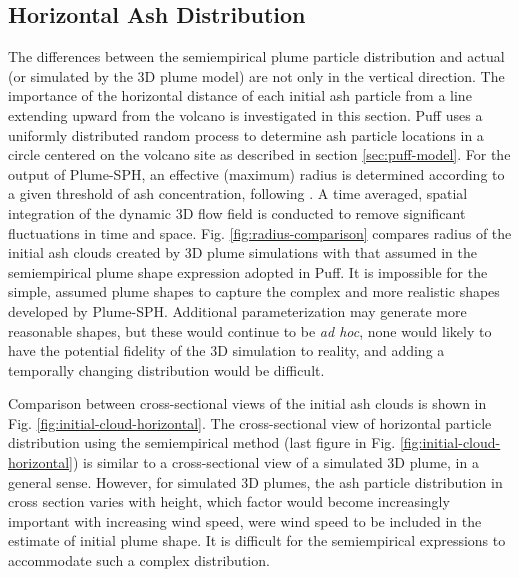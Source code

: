 \documentclass[utf8]{frontiersSCNS} %
\begin{document}
\subsection{Horizontal Ash Distribution}

The differences between the semiempirical plume particle distribution and actual (or simulated by the 3D plume model) are not only in the vertical direction. The importance of the horizontal distance of each initial ash particle from a line extending upward from the volcano is investigated in this section.  Puff uses a uniformly distributed random process to determine ash particle locations in a circle centered on the volcano site as described in section \ref{sec:puff-model}. For the output of Plume-SPH, an effective (maximum) radius is determined according to a given threshold of ash concentration, following \citet {cerminara2016large}. A time averaged, spatial integration of the dynamic 3D flow field is conducted to remove significant fluctuations in time and space. Fig. \ref{fig:radius-comparison} compares radius of the initial ash clouds created by 3D plume simulations with that assumed in the semiempirical plume shape expression adopted in Puff. It is impossible for the simple, assumed plume shapes to capture the complex and more realistic shapes developed by Plume-SPH. Additional parameterization may generate more reasonable shapes, but these would continue to be \textit{ad hoc}, none would likely to have the potential fidelity of the 3D simulation to reality, and adding a temporally changing distribution would be difficult.

Comparison between cross-sectional views of the initial ash clouds is shown in Fig. \ref{fig:initial-cloud-horizontal}. The cross-sectional view of horizontal particle distribution using the semiempirical method (last figure in Fig. \ref{fig:initial-cloud-horizontal}) is similar to a cross-sectional view of a simulated 3D plume, in a general sense. However, for simulated 3D plumes, the ash particle distribution in cross section varies with height, which factor would become increasingly important with increasing wind speed, were wind speed to be included in the estimate of initial plume shape. It is difficult for the semiempirical expressions to accommodate such a complex distribution.
\end{document}
